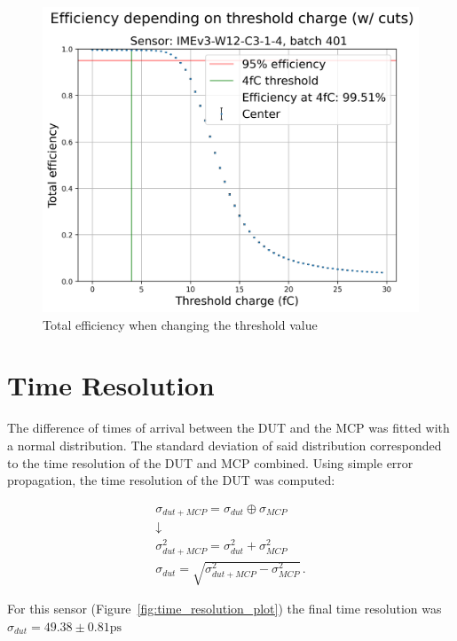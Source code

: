 \begin{figure}
    \centering
    \includegraphics[width=0.5\linewidth]{Images/efficiency_plots/Efficiency depending on threshold charge (with cuts) batch 401 S1.png}
    \caption{Total efficiency when changing the threshold value}
    \label{fig:efficiency_depending_threshold}
\end{figure}


\section{Time Resolution}\label{sec:time_resolution}

The difference of times of arrival between the DUT and the MCP was fitted with a normal distribution. The standard deviation of said distribution corresponded to the time resolution of the DUT and MCP combined. Using simple error propagation, the time resolution of the DUT was computed: 

\begin{equation*}
    \begin{gathered}
    \sigma_{dut+MCP} = \sigma_{dut} \oplus \sigma_{MCP} \\
    \downarrow \\
    \sigma_{dut+MCP}^2 = \sigma_{dut}^2 + \sigma_{MCP}^2 \\
    \sigma_{dut} = \sqrt{\sigma_{dut+MCP}^2-\sigma_{MCP}^2}  \, .
    \end{gathered}
\end{equation*}

For this sensor (Figure~\ref{fig:time_resolution_plot}) the final time resolution was \(\sigma_{dut} = 49.38\pm0.81\si{\ps} \)

